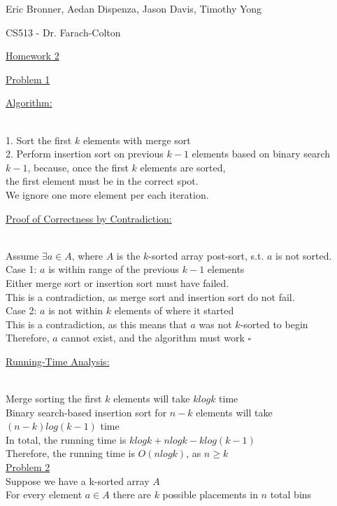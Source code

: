 \documentclass[12pt]{article}
\begin{document}
\pagestyle{headings}
\centerline{Eric Bronner, Aedan Dispenza, Jason Davis, Timothy Yong}
\centerline{CS513 - Dr. Farach-Colton}
\centerline{\underline{Homework 2}}
\noindent \underline{Problem 1}\\
\centerline{\underline{Algorithm:}}\\
1. Sort the first $k$ elements with merge sort\\ 
2. Perform insertion sort on previous $k-1$ elements based on binary search\\
\indent $k-1$, because, once the first $k$ elements are sorted,\\ 
\indent the first element must be in the correct spot.\\
\indent We ignore one more element per each iteration.\\
\centerline{\underline{Proof of Correctness by Contradiction:}}\\
Assume $\exists a \in A$, where $A$ is the $k$-sorted array post-sort, s.t. $a$ is not sorted.\\
Case 1: $a$ is within range of the previous $k-1$ elements\\
\indent Either merge sort or insertion sort must have failed.\\
\indent This is a contradiction, as merge sort and insertion sort do not fail.\\
Case 2: $a$ is not within $k$ elements of where it started\\
\indent This is a contradiction, as this means that $a$ was not $k$-sorted to begin\\
Therefore, $a$ cannot exist, and the algorithm must work $\square$\\
\centerline{\underline{Running-Time Analysis:}}\\
Merge sorting the first $k$ elements will take $klog{k}$ time\\
Binary search-based insertion sort for $n-k$ elements will take\\
\indent $(n-k)log{(k-1)}$ time\\  
In total, the running time is $klog{k} + nlog{k} - klog{(k-1)}$\\
Therefore, the running time is $O(nlog{k})$, as $n \geq k$\\
\underline{Problem 2}\\
Suppose we have a k-sorted array $A$\\
For every element $a \in A$ there are $k$ possible placements in $n$ total bins\\
\end{document}
